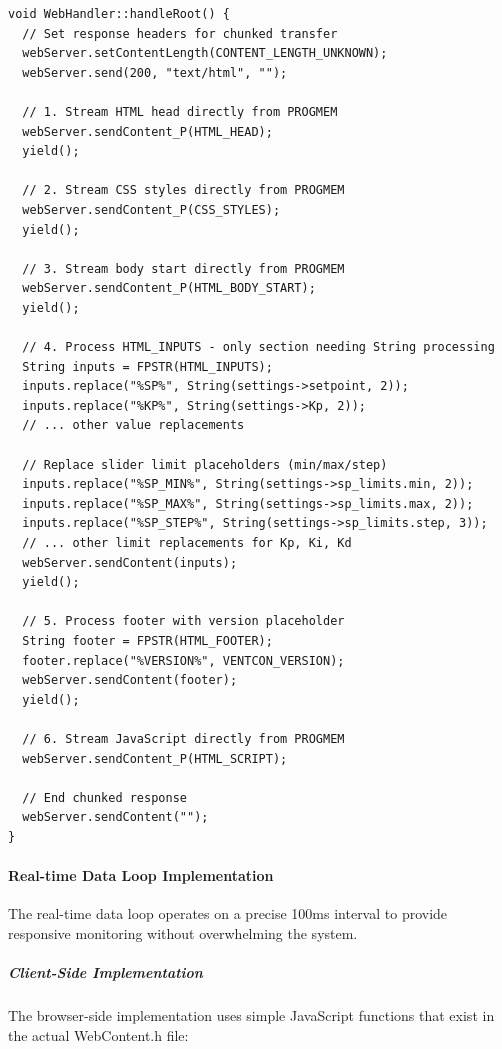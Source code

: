 \begin{lstlisting}[caption=handleRoot() Streaming Implementation]
void WebHandler::handleRoot() {
  // Set response headers for chunked transfer
  webServer.setContentLength(CONTENT_LENGTH_UNKNOWN);
  webServer.send(200, "text/html", "");
  
  // 1. Stream HTML head directly from PROGMEM
  webServer.sendContent_P(HTML_HEAD);
  yield();
  
  // 2. Stream CSS styles directly from PROGMEM
  webServer.sendContent_P(CSS_STYLES);
  yield();
  
  // 3. Stream body start directly from PROGMEM  
  webServer.sendContent_P(HTML_BODY_START);
  yield();
  
  // 4. Process HTML_INPUTS - only section needing String processing
  String inputs = FPSTR(HTML_INPUTS);
  inputs.replace("%SP%", String(settings->setpoint, 2));
  inputs.replace("%KP%", String(settings->Kp, 2));
  // ... other value replacements
  
  // Replace slider limit placeholders (min/max/step)
  inputs.replace("%SP_MIN%", String(settings->sp_limits.min, 2));
  inputs.replace("%SP_MAX%", String(settings->sp_limits.max, 2));
  inputs.replace("%SP_STEP%", String(settings->sp_limits.step, 3));
  // ... other limit replacements for Kp, Ki, Kd
  webServer.sendContent(inputs);
  yield();
  
  // 5. Process footer with version placeholder
  String footer = FPSTR(HTML_FOOTER);
  footer.replace("%VERSION%", VENTCON_VERSION);
  webServer.sendContent(footer);
  yield();
  
  // 6. Stream JavaScript directly from PROGMEM
  webServer.sendContent_P(HTML_SCRIPT);
  
  // End chunked response
  webServer.sendContent("");
}
\end{lstlisting}

\paragraph{Real-time Data Loop Implementation}
The real-time data loop operates on a precise 100ms interval to provide responsive monitoring without overwhelming the system.

\subparagraph{Client-Side Implementation}
The browser-side implementation uses simple JavaScript functions that exist in the actual WebContent.h file:


